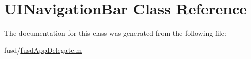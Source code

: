 \hypertarget{class_u_i_navigation_bar}{
\section{\-U\-I\-Navigation\-Bar \-Class \-Reference}
\label{class_u_i_navigation_bar}
}


\-The documentation for this class was generated from the following file\-:\begin{DoxyCompactItemize}
\item 
fusd/\hyperlink{fusd_app_delegate_8m}{fusd\-App\-Delegate.\-m}\end{DoxyCompactItemize}
